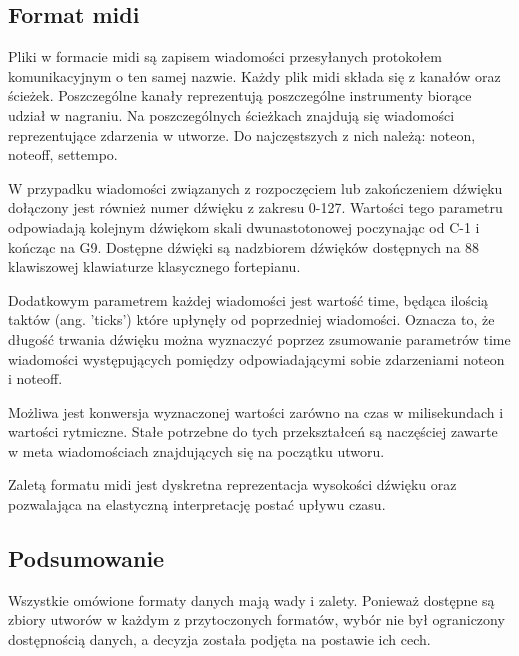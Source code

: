 {{        \subsection{Format midi}
        {
            Pliki w formacie midi są zapisem wiadomości przesyłanych protokołem komunikacyjnym o ten samej nazwie.
            Każdy plik midi składa się z kanałów oraz ścieżek. Poszczególne kanały reprezentują poszczególne instrumenty
            biorące udział w nagraniu. Na poszczególnych ścieżkach znajdują się wiadomości reprezentujące zdarzenia w utworze.
            Do najczęstszych z nich należą: note\textunderscore on, note\textunderscore off, set\textunderscore tempo.

            W przypadku wiadomości związanych z rozpoczęciem lub zakończeniem
            dźwięku dołączony jest również numer dźwięku z zakresu 0-127. 
            Wartości tego parametru odpowiadają kolejnym dźwiękom skali dwunastotonowej poczynając od C-1 i kończąc na G9.
            Dostępne dźwięki są nadzbiorem dźwięków dostępnych na 88 klawiszowej klawiaturze klasycznego fortepianu.

            Dodatkowym parametrem każdej wiadomości jest wartość time, będąca ilością taktów (ang. 'ticks') które upłynęły
            od poprzedniej wiadomości. Oznacza to, że długość trwania dźwięku można wyznaczyć poprzez zsumowanie parametrów time
            wiadomości występujących pomiędzy odpowiadającymi sobie zdarzeniami note\textunderscore on i note\textunderscore off.

            Możliwa jest konwersja wyznaczonej wartości zarówno na czas w milisekundach i wartości rytmiczne.
            Stałe potrzebne do tych przekształceń są naczęściej zawarte w meta wiadomościach znajdujących się na początku utworu.

            Zaletą formatu midi jest dyskretna reprezentacja wysokości dźwięku oraz pozwalająca na elastyczną 
            interpretację postać upływu czasu.
        }

        \subsection{Podsumowanie}
        {

            Wszystkie omówione formaty danych mają wady i zalety. 
            Ponieważ dostępne są zbiory utworów w każdym z przytoczonych formatów, wybór nie był ograniczony dostępnością danych, 
            a decyzja została podjęta na postawie ich cech.
            
}}}
